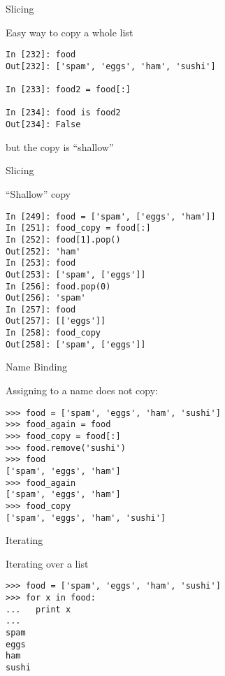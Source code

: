 \documentclass{beamer}
\begin{document}
\begin{frame}[fragile]{Slicing}

{\large Easy way to copy a whole list}

\begin{verbatim}
In [232]: food
Out[232]: ['spam', 'eggs', 'ham', 'sushi']

In [233]: food2 = food[:]

In [234]: food is food2
Out[234]: False

\end{verbatim}

{\Large but the copy is ``shallow''}

\end{frame} 

\begin{frame}[fragile]{Slicing}

{\Large ``Shallow'' copy}

\begin{verbatim}
In [249]: food = ['spam', ['eggs', 'ham']]
In [251]: food_copy = food[:]
In [252]: food[1].pop()
Out[252]: 'ham'
In [253]: food
Out[253]: ['spam', ['eggs']]
In [256]: food.pop(0)
Out[256]: 'spam'
In [257]: food
Out[257]: [['eggs']]
In [258]: food_copy
Out[258]: ['spam', ['eggs']]
\end{verbatim}

\end{frame} 

\begin{frame}[fragile]{Name Binding}

{\Large Assigning to a name does not copy:}

\begin{verbatim}
>>> food = ['spam', 'eggs', 'ham', 'sushi']
>>> food_again = food
>>> food_copy = food[:]
>>> food.remove('sushi')
>>> food
['spam', 'eggs', 'ham']
>>> food_again
['spam', 'eggs', 'ham']
>>> food_copy
['spam', 'eggs', 'ham', 'sushi']
\end{verbatim}

\end{frame} 

\begin{frame}[fragile]{Iterating}

{\Large Iterating over a list}

\begin{verbatim}
>>> food = ['spam', 'eggs', 'ham', 'sushi']
>>> for x in food:
...   print x
...
spam
eggs
ham
sushi
\end{verbatim}

\end{frame} 
\end{document}
